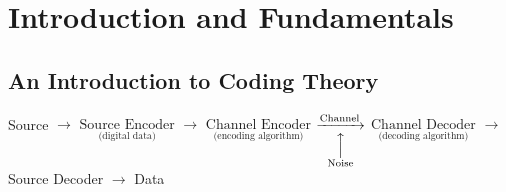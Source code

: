 \chapter{Introduction and Fundamentals}
\section{An Introduction to Coding Theory}

Source
$ \rightarrow $
$ \underset{\text{(digital data)}}{\text{Source Encoder}} $
$ \rightarrow $
$ \underset{\text{(encoding algorithm)}}{\text{Channel Encoder}} $
$ \underset{\overset{\Big\uparrow}{\text{Noise}}}{\xrightarrow{\text{Channel}}} $
$ \underset{\text{(decoding algorithm)}}{\text{Channel Decoder}} $
$ \rightarrow $
Source Decoder $ \rightarrow $ Data

